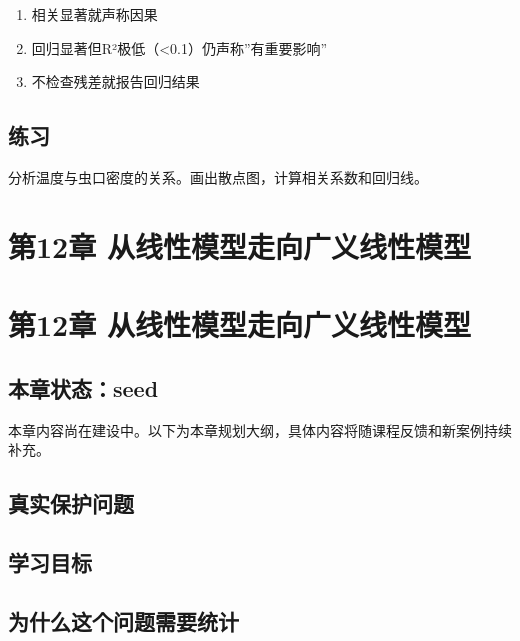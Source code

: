 \documentclass[
  letterpaper,
]{scrbook}
\providecommand{\tightlist}{%
  \setlength{\itemsep}{0pt}\setlength{\parskip}{0pt}}
\begin{document}
\begin{enumerate}
\def\labelenumi{\arabic{enumi}.}
\tightlist
\item
  相关显著就声称因果
\item
  回归显著但R²极低（\textless0.1）仍声称''有重要影响''
\item
  不检查残差就报告回归结果
\end{enumerate}

\section{练习}\label{ux7ec3ux4e60-10}

分析温度与虫口密度的关系。画出散点图，计算相关系数和回归线。

\chapter{第12章
从线性模型走向广义线性模型}\label{ux7b2c12ux7ae0-ux4eceux7ebfux6027ux6a21ux578bux8d70ux5411ux5e7fux4e49ux7ebfux6027ux6a21ux578b}

\chapter{第12章
从线性模型走向广义线性模型}\label{ux7b2c12ux7ae0-ux4eceux7ebfux6027ux6a21ux578bux8d70ux5411ux5e7fux4e49ux7ebfux6027ux6a21ux578b-1}

\section{本章状态：seed}\label{ux672cux7ae0ux72b6ux6001seed-2}

本章内容尚在建设中。以下为本章规划大纲，具体内容将随课程反馈和新案例持续补充。

\section{真实保护问题}\label{ux771fux5b9eux4fddux62a4ux95eeux9898-8}

\section{学习目标}\label{ux5b66ux4e60ux76eeux6807-5}

\section{为什么这个问题需要统计}\label{ux4e3aux4ec0ux4e48ux8fd9ux4e2aux95eeux9898ux9700ux8981ux7edfux8ba1-2}
\end{document}
